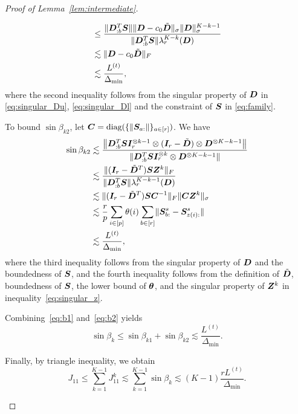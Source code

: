 \documentclass[lettersize,onecolumn,journal]{IEEEtran}
\theoremstyle{definition}
\theoremstyle{definition}
\begin{document}
\begin{proof}[Proof of Lemma~\ref{lem:intermediate}]
\begin{enumerate}[wide]
\begin{align}
        &\leq \frac{ \lVert\bm{D}_{:b}^{T} \bm S\rVert \lVert\bm{D} - c_0 \tilde {\bm{D}}\rVert_{\sigma} \lVert\bm{D}\rVert_{\sigma}^{K-k-1} }{\lVert\bm{D}_{:b}^{T} \bm S\rVert \lambda_r^{K-k}(\bm{D}) }\\
        & \lesssim  \lVert\bm{D} - c_0 \tilde {\bm{D}}\rVert_{F}\\
        & \lesssim \frac{L^{(t)}}{\Delta_{\min}},
    \end{align}
    where the second inequality follows from the singular property of $\bm{D}$ in \eqref{eq:singular_Du}, \eqref{eq:singular_Dl} and the constraint of $\bm S$ in \eqref{eq:family}.
    
    To bound $\sin \beta_{k2}$, let $\bm C = \text{diag}(\{\lVert\bm S_{a:}\rVert\}_{a \in [r]})$. We have 
    \begin{align}\label{eq:b2}
        \sin \beta_{k2} &\lesssim \frac{ \onorm{\mD_{:b}^{T} \mS \mI_r^{\otimes k-1} \otimes (\mI_r - \tilde \mD) \otimes \mD^{\otimes K-k-1} } }{\onormSize{}{\mD_{:b}^{T} \mS \mI_r^{\otimes k} \otimes \mD^{\otimes K-k-1} }  }\\
        & \lesssim \frac{ \onormSize{}{(\mI_r - \tilde \mD^T) \mS \mZ^k}_F }{\onormSize{}{\mD_{:b}^{T} \mS} \lambda_r^{K-k-1}(\mD)} \\
        & \lesssim \onormSize{ }{(\mI_r - \tilde \mD^T) \mS \mC^{-1}}_F \onormSize{}{\mC \mZ^k}_{\sigma}\\
        & \lesssim \frac{r}{p} \sum_{i \in [p]} \theta(i) \sum_{b \in [r]} \onormSize{}{\mS_{b:}^s - \mS_{z(i):}^s} \\
        & \lesssim \frac{L^{(t)}}{\Delta_{\min}}, 
    \end{align}
    where the third inequality follows from the singular property of $\bm{D}$ and the boundedness of $\bm S$, and the fourth inequality follows from the definition of $\tilde {\bm{D}}$, boundedness of $\bm S$, the lower bound of $\boldsymbol{\theta}$, and the singular property of $\bm Z^k$ in inequality~\eqref{eq:singular_z}. 
    
  Combining~\eqref{eq:b1} and~\eqref{eq:b2} yields
    \begin{equation}
        \sin \beta_k \leq \sin \beta_{k1} + \sin \beta_{k2} \lesssim \frac{L^{(t)}}{\Delta_{\min}}.
    \end{equation}

    
       Finally, by triangle inequality, we obtain
    \begin{equation}\label{eq:j1}
        J_{11} \leq \sum_{k = 1}^{K-1} J_{11}^k \lesssim  \sum_{k = 1}^{K-1} \sin \beta_k  \lesssim (K-1)\frac{r L^{(t)}}{\Delta_{\min}}.
    \end{equation}
    


\end{enumerate}
\end{proof}
\end{document}
